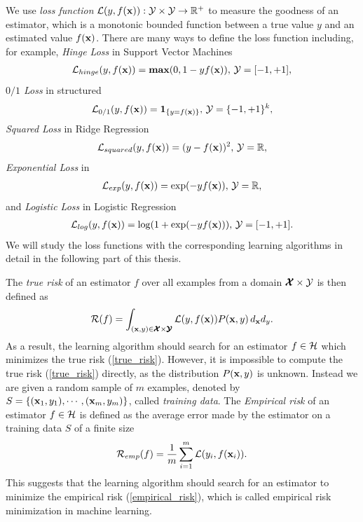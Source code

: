 We use \textit{loss function} $\mathcal{L}(y,f(\mathbf {x})):\mathcal{Y}\times\mathcal{Y}\rightarrow\mathbb{R}^+$ to measure the goodness of an estimator, which is a monotonic bounded function between a true value $y$ and an estimated value $f(\mathbf {x})$.
There are many ways to define the loss function including, for example,
\textit{Hinge Loss} in Support Vector Machines \citep{Cortes95support}
\begin{align}
	\mathcal{L}_{hinge}(y,f(\mathbf {x})) = \textbf{max} (0,1-y f(\mathbf {x})),\, \mathcal{Y}=[-1,+1], \label{hinge_loss}
\end{align}
\textit{$0/1$ Loss} in structured \svm\ \citep{THJA04}
\begin{align}
	\mathcal{L}_{0/1}(y,f(\mathbf {x})) = \mathbf{1}_{\{y=f(\mathbf {x})\}},\, \mathcal{Y} = \{-1,+1\}^k, \label{one_loss}
\end{align}
\textit{Squared Loss} in Ridge Regression \citep{Hoerl00ridge}
\begin{align*}
	\mathcal{L}_{squared}(y,f(\mathbf {x})) = (y-f(\mathbf {x}))^2,\, \mathcal{Y}=\mathbb{R},
\end{align*}
\textit{Exponential Loss} in \adaboost\ \citep{Schapire99improved}
\begin{align}
	\mathcal{L}_{exp}(y,f(\mathbf {x})) = \exp(-y f(\mathbf {x})),\, \mathcal{Y}=\mathbb{R}, \label{exp_loss}
\end{align}
and \textit{Logistic Loss} in Logistic Regression \citep{Chen99}
\begin{align}
	\mathcal{L}_{log}(y,f(\mathbf {x})) = \log(1+\exp(-y f(\mathbf {x}))),\, \mathcal{Y}=[-1,+1]. \label{log_loss}
\end{align}
We will study the loss functions with the corresponding learning algorithms in detail in the following part of this thesis.

The \textit{true risk} of an estimator $f$ over all examples from a domain $\pmb {\mathcal{X}}\times\mathcal{Y}$ is then defined as
\begin{align}
	\mathcal{R}(f) = \int_{(\mathbf {x},y)\in\pmb {\mathcal{X}}\times\pmb {\mathcal{Y}}}\mathcal{L}(y,f(\mathbf {x}))P(\mathbf {x},y)\,d_{\mathbf {x}}d_{y} \label{true_risk}.
\end{align}
As a result, the learning algorithm should search for an estimator $f\in\mathcal{H}$ which minimizes the true risk (\ref{true_risk}).
However, it is impossible to compute the true risk (\ref{true_risk}) directly, as the distribution $P(\mathbf {x},y)$ is unknown.
Instead we are given a random sample of $m$ examples, denoted by $S=\{(\mathbf {x}_1,y_1),\cdots,(\mathbf {x}_m,y_m)\}$, called \textit{training data}.
The \textit{Empirical risk} of an estimator $f\in\mathcal{H}$ is defined as the average error made by the estimator on a training data $S$ of a finite size
\begin{align}
	\mathcal{R}_{emp}(f) = \frac{1}{m}\sum_{i=1}^{m}\mathcal{L}(y_i,f(\mathbf {x}_i)) \label{empirical_risk}.
\end{align}
This suggests that the learning algorithm should search for an estimator to minimize the empirical risk (\ref{empirical_risk}), which is called {empirical risk minimization} \citep{Vapnik92principles} in machine learning.

